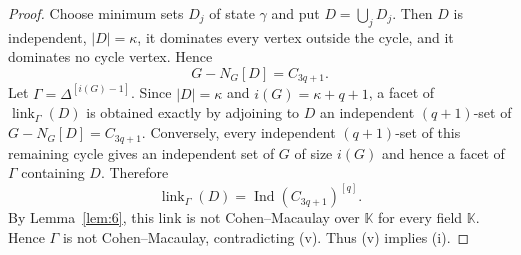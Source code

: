 \documentclass[10pt,a4paper]{amsart}
\DeclareMathOperator{\Ind}{Ind}
\newcommand{\K}{\mathbb K}
\DeclareMathOperator{\link}{link}
\begin{document}
\begin{proof}
		Choose minimum sets $D_j$ of state $\gamma$ and put $D=\bigcup_jD_j$.  Then $D$ is independent, $|D|=\kappa$, it dominates every vertex outside the cycle, and it dominates no cycle vertex.  Hence
		\[
		G-N_G[D]=C_{3q+1}.
		\]
		Let $\Gamma=\Delta^{[i(G)-1]}$.  Since $|D|=\kappa$ and $i(G)=\kappa+q+1$, a facet of $\link_\Gamma(D)$ is obtained exactly by adjoining to $D$ an independent $(q+1)$-set of $G-N_G[D]=C_{3q+1}$.  Conversely, every independent $(q+1)$-set of this remaining cycle gives an independent set of $G$ of size $i(G)$ and hence a facet of $\Gamma$ containing $D$.  Therefore
		\[
		\link_\Gamma(D)=\Ind(C_{3q+1})^{[q]}.
		\]
		By Lemma~\ref{lem:6}, this link is not Cohen--Macaulay over $\K$ for every field $\K$.  Hence $\Gamma$ is not Cohen--Macaulay, contradicting (v).  Thus (v) implies (i).
	\end{proof}
\end{document}
